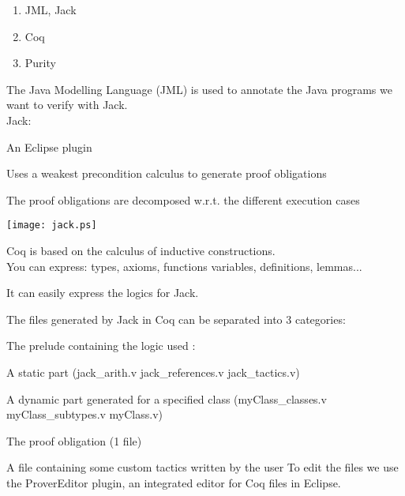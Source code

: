 \begin{enumerate}
\item{JML, Jack}
\item{Coq}
\item{Purity}
\end{enumerate}

\small
The {\purple Java Modelling Language} (JML)
is used to annotate the Java programs we want to verify with 
Jack.\\
Jack:
\blist
\item An Eclipse plugin
\item Uses a {\purple weakest precondition calculus} to generate proof obligations
\item The proof obligations are decomposed w.r.t. the different 
{\purple execution cases}
\elist
\begin{center}
\texttt{[image: jack.ps]}
\end{center}


\small
Coq is based on the {\purple calculus of inductive constructions}.\\
You can express: types, axioms, functions
variables, definitions, {\purple lemmas}...



It can easily express the logics for Jack.

The files generated by Jack in Coq can be separated into 3 categories:
\blist 
\item The {\purple prelude} containing the logic used :
\blist 
\item A static part (jack\_arith.v jack\_references.v jack\_tactics.v)
\item A dynamic part generated for a specified class (myClass\_classes.v 
myClass\_subtypes.v myClass.v)

\elist
\item The {\purple proof obligation} (1 file)
\item A file containing some {\purple custom tactics} written by the user
\elist
To edit the files we use the {\purple ProverEditor} plugin, an integrated editor for Coq files in Eclipse.

